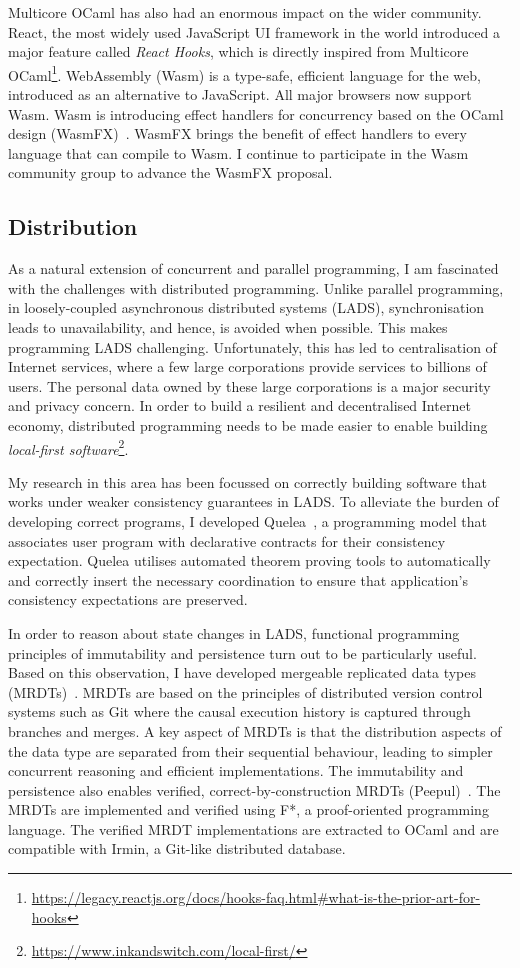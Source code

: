 \documentclass[screen,acmsmall,nonacm]{acmart}
\begin{document}
Multicore OCaml has also had an enormous impact on the wider community. React,
the most widely used JavaScript UI framework in the world introduced a major
feature called \emph{React Hooks}, which is directly inspired from Multicore
OCaml\footnote{\url{https://legacy.reactjs.org/docs/hooks-faq.html\#what-is-the-prior-art-for-hooks}}.
WebAssembly (Wasm) is a type-safe, efficient language for the web, introduced
as an alternative to JavaScript. All major browsers now support Wasm. Wasm is
introducing effect handlers for concurrency based on the OCaml design
(WasmFX)~\cite{WasmFX}. WasmFX brings the benefit of effect handlers to every
language that can compile to Wasm. I continue to participate in the Wasm
community group to advance the WasmFX proposal.

\subsection{Distribution}

As a natural extension of concurrent and parallel programming, I am fascinated
with the challenges with distributed programming. Unlike parallel programming,
in loosely-coupled asynchronous distributed systems (LADS), synchronisation
leads to unavailability, and hence, is avoided when possible. This makes
programming LADS challenging. Unfortunately, this has led to centralisation of
Internet services, where a few large corporations provide services to billions
of users. The personal data owned by these large corporations is a major
security and privacy concern. In order to build a resilient and decentralised
Internet economy, distributed programming needs to be made easier to enable
building \emph{local-first
software}\footnote{\url{https://www.inkandswitch.com/local-first/}}.

My research in this area has been focussed on correctly building software that
works under weaker consistency guarantees in LADS. To alleviate the burden of
developing correct programs, I developed Quelea~\cite{quelea}, a programming
model that associates user program with declarative contracts for their
consistency expectation. Quelea utilises automated theorem proving tools to
automatically and correctly insert the necessary coordination to ensure that
application's consistency expectations are preserved.

In order to reason about state changes in LADS, functional programming
principles of immutability and persistence turn out to be particularly useful.
Based on this observation, I have developed mergeable replicated data types
(MRDTs)~\cite{mrdt}. MRDTs are based on the principles of distributed version
control systems such as Git where the causal execution history is captured
through branches and merges. A key aspect of MRDTs is that the distribution
aspects of the data type are separated from their sequential behaviour, leading
to simpler concurrent reasoning and efficient implementations. The immutability
and persistence also enables verified, correct-by-construction MRDTs
(Peepul)~\cite{peepul}. The MRDTs are implemented and verified using F*, a
proof-oriented programming language. The verified MRDT implementations are
extracted to OCaml and are compatible with Irmin, a Git-like distributed
database.
\end{document}
